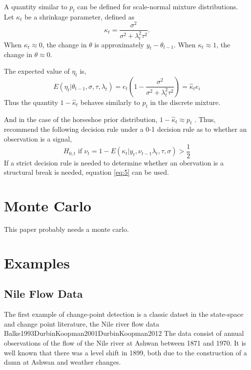 \documentclass{article}
\begin{document}
A quantity similar to $p_{t}$ can be defined for scale-normal mixture distributions.
Let $\kappa_{t}$ be a shrinkage parameter, defined as
\begin{equation}
  \label{eq:3}
  \kappa_{t} = \frac{\sigma^{2}}{\sigma^{2} + \lambda^{2}_{t} \tau^{2}} \text{.}
\end{equation}
When $\kappa_{t} \approx 0$, the change in $\theta$ is approximately $y_{t} - \theta_{t-1}$.
When $\kappa_{t} \approx 1$, the change in $\theta \approx 0$.

The expected value of $\eta_{t}$ is,
\begin{equation}
  \label{eq:10}
  E(\eta_{t} | \theta_{t - 1}, \sigma, \tau, \lambda_{t}) = e_{t}
  \left(
    1 - \frac{\sigma^{2}}{\sigma^{2} + \lambda^{2}_{t} \tau^{2}}
  \right)  = \hat \kappa_{t} e_{i}
\end{equation}
Thus the quantity $1 - \hat \kappa_{t}$ behaves similarly to $p_{t}$ in the discrete mixture.

And in the case of the horseshoe prior distribution, $1 - \hat \kappa_{t} \approx p_{t}$ \parencite[474]{CarvalhoPolsonScott2010}.
Thus, \textcite{CarvalhoPolsonScott2010} recommend the following  decision rule under a 0-1 decision rule as to whether an observation is a signal,
\begin{equation}
  \label{eq:5}
  \text{$H_{0,t}$ if $\nu_{t} = 1 - E(\kappa_{t}|y_{t}, \nu_{t-1} \lambda_{t}, \tau, \sigma) > \frac{1}{2}$}
\end{equation}
If a strict decision rule is needed to determine whether an obervation is a structural break is needed, equation \eqref{eq:5} can be used.

\section{Monte Carlo}
\label{sec:monte-carlo}

This paper probably needs a monte carlo.

\section{Examples}
\label{sec:examples}

\subsection{Nile Flow Data}
\label{sec:nile}

The first example of change-point detection is a classic datset in the state-space and change point literature, the Nile river flow data \textcite{Cobb1978}{Balke1993}{DurbinKoopman2001}{DurbinKoopman2012}
The data consist of annual observations of the flow of the Nile river at Ashwan between 1871 and 1970.
It is well known that there was a level shift in 1899, both due to the construction of a damn at Ashwan and weather changes.
\end{document}
